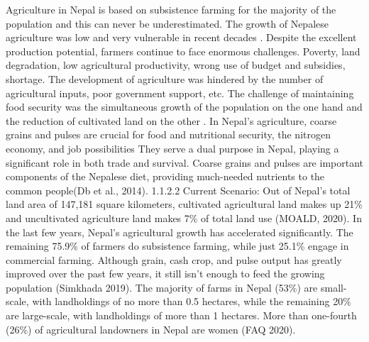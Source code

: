 Agriculture in Nepal is based on subsistence farming for the majority of the population and this can never be underestimated. The growth of Nepalese agriculture was low and very vulnerable in recent decades  \parencite{gyawaliOverviewAgricultureNepal2021}. Despite the excellent production potential, farmers continue to face enormous challenges. Poverty, land degradation, low agricultural productivity, wrong use of budget and subsidies, shortage. The development of agriculture was hindered by the number of agricultural inputs, poor government support, etc. The challenge of maintaining food security was the simultaneous growth of the population on the one hand and the reduction of cultivated land on the other \parencite{gyawaliOverviewAgricultureNepal2021}.
In Nepal's agriculture, coarse grains and pulses are crucial for food and nutritional security, the nitrogen economy, and job possibilities  They serve a dual purpose in Nepal, playing a significant role in both trade and survival. Coarse grains and pulses are important components of the Nepalese diet, providing much-needed nutrients to the common people(Db et al., 2014). 
1.1.2.2 Current Scenario:
Out of Nepal's total land area of 147,181 square kilometers, cultivated agricultural land makes up 21\% and uncultivated agriculture land makes 7\% of total land use (MOALD, 2020). In the last few years, Nepal's agricultural growth has accelerated significantly. The remaining 75.9\% of farmers do subsistence farming, while just 25.1\% engage in commercial farming. Although grain, cash crop, and pulse output has greatly improved over the past few years, it still isn't enough to feed the growing population (Simkhada 2019). The majority of farms in Nepal (53\%) are small-scale, with landholdings of no more than 0.5 hectares, while the remaining 20\% are large-scale, with landholdings of more than 1 hectares. More than one-fourth (26\%) of agricultural landowners in Nepal are women (FAQ 2020). 

